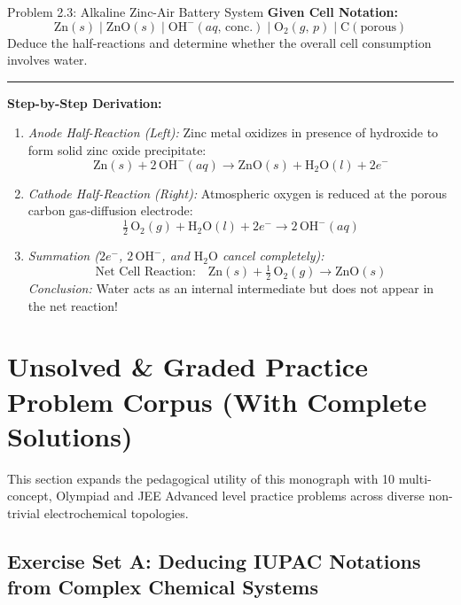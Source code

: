 \documentclass[10pt,a4paper]{article}
\begin{document}
\begin{examplebox}{Problem 2.3: Alkaline Zinc-Air Battery System}
\textbf{Given Cell Notation:}
\begin{equation*}
    \text{Zn}(s) \mid \text{ZnO}(s) \mid \text{OH}^-(aq,\, \text{conc.}) \mid \text{O}_2(g,\, p) \mid \text{C}(\text{porous})
\end{equation*}
Deduce the half-reactions and determine whether the overall cell consumption involves water.

\vspace{0.3cm}\hrule\vspace{0.3cm}
\textbf{Step-by-Step Derivation:}
\begin{enumerate}
    \item \textit{Anode Half-Reaction (Left):}
    Zinc metal oxidizes in presence of hydroxide to form solid zinc oxide precipitate:
    $$\text{Zn}(s) + 2\,\text{OH}^-(aq) \longrightarrow \text{ZnO}(s) + \text{H}_2\text{O}(l) + 2e^-$$
    \item \textit{Cathode Half-Reaction (Right):}
    Atmospheric oxygen is reduced at the porous carbon gas-diffusion electrode:
    $$\tfrac{1}{2}\,\text{O}_2(g) + \text{H}_2\text{O}(l) + 2e^- \longrightarrow 2\,\text{OH}^-(aq)$$
    \item \textit{Summation ($2e^-$, $2\,\text{OH}^-$, and $\text{H}_2\text{O}$ cancel completely):}
    $$\text{Net Cell Reaction:} \quad \text{Zn}(s) + \tfrac{1}{2}\,\text{O}_2(g) \longrightarrow \text{ZnO}(s)$$
    \textit{Conclusion:} Water acts as an internal intermediate but does not appear in the net reaction!
\end{enumerate}
\end{examplebox}

\newpage
\section{Unsolved \& Graded Practice Problem Corpus (With Complete Solutions)}

This section expands the pedagogical utility of this monograph with 10 multi-concept, Olympiad and JEE Advanced level practice problems across diverse non-trivial electrochemical topologies.

\subsection{Exercise Set A: Deducing IUPAC Notations from Complex Chemical Systems}
\end{document}
